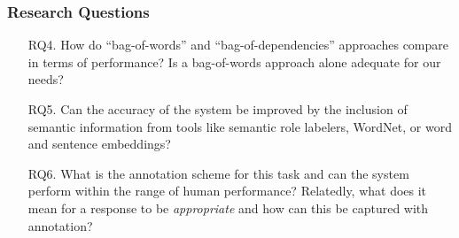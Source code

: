 \documentclass[handout,xcolor={dvipsnames}]{beamer}
\begin{document}
\begin{frame}
\frametitle{Research Questions}
\small
\begin{itemize}
\pause
\item[RQ4.]{How do ``bag-of-words'' and ``bag-of-dependencies'' approaches compare in terms of performance? Is a bag-of-words approach alone adequate for our needs?}
\pause
\vspace{2em}
\item[RQ5.]{Can the accuracy of the system be improved by the inclusion of semantic information from tools like semantic role labelers, WordNet, or word and sentence embeddings?}

\pause
\vspace{2em}
\item[RQ6.]{What is the annotation scheme for this task and can the system perform within the range of human performance? Relatedly, what does it mean for a response to be \textit{appropriate} and how can this be captured with annotation?}
\end{itemize}
\end{frame}
\end{document}
